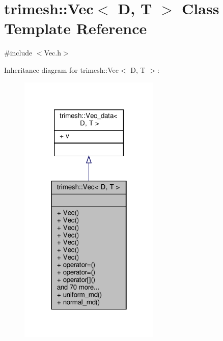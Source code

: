 \hypertarget{classtrimesh_1_1Vec}{}\section{trimesh\+:\+:Vec$<$ D, T $>$ Class Template Reference}
\label{classtrimesh_1_1Vec}


{\ttfamily \#include $<$Vec.\+h$>$}



Inheritance diagram for trimesh\+:\+:Vec$<$ D, T $>$\+:\nopagebreak
\begin{figure}[H]
\begin{center}
\leavevmode
\includegraphics[width=190pt]{d2/d18/classtrimesh_1_1Vec__inherit__graph}
\end{center}
\end{figure}


